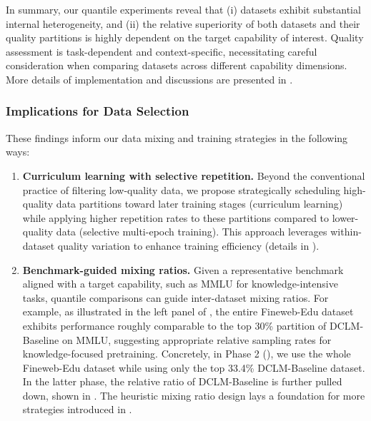 In summary, our quantile experiments reveal that (i) datasets exhibit substantial internal heterogeneity, and (ii) the relative superiority of both datasets and their quality partitions is highly dependent on the target capability of interest. 
Quality assessment is task-dependent and context-specific, necessitating careful consideration when comparing datasets across different capability dimensions. More details of implementation and discussions are presented in .

\subsubsection{Implications for Data Selection}
These findings inform our data mixing and training strategies in the following ways:

\begin{enumerate}
    \item[(1)] \textbf{Curriculum learning with selective repetition.} Beyond the conventional practice of filtering low-quality data, we propose strategically scheduling high-quality data partitions toward later training stages (curriculum learning) while applying higher repetition rates to these partitions compared to lower-quality data (selective multi-epoch training). This approach leverages within-dataset quality variation to enhance training efficiency (details in ).
    
    \item[(2)] \textbf{Benchmark-guided mixing ratios.} Given a representative benchmark aligned with a target capability, such as MMLU for knowledge-intensive tasks, quantile comparisons can guide inter-dataset mixing ratios. For example, as illustrated in the left panel of , the entire Fineweb-Edu dataset exhibits performance roughly comparable to the top 30\% partition of DCLM-Baseline on MMLU, suggesting appropriate relative sampling rates for knowledge-focused pretraining. 
    Concretely, in Phase 2 (), we use the whole Fineweb-Edu dataset while using only the top 33.4\% DCLM-Baseline dataset. In the latter phase, the relative ratio of DCLM-Baseline is further pulled down, shown in . The heuristic mixing ratio design lays a foundation for more strategies introduced in .
\end{enumerate}

